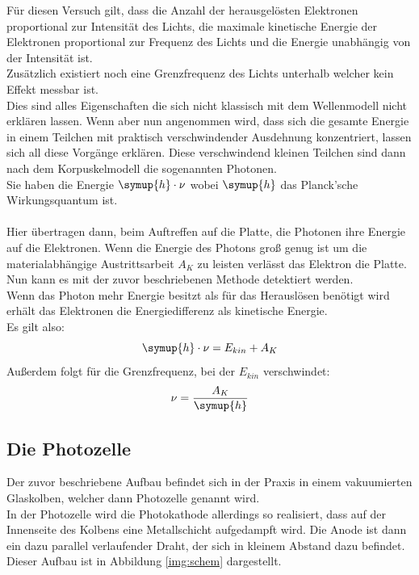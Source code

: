     \noindent Für diesen Versuch gilt, dass die Anzahl der herausgelösten Elektronen proportional zur Intensität des Lichts, 
    die maximale kinetische Energie der Elektronen proportional zur Frequenz des Lichts und die Energie unabhängig von der Intensität ist.\\
    Zusätzlich existiert noch eine Grenzfrequenz des Lichts unterhalb welcher kein Effekt messbar ist.\\
    Dies sind alles Eigenschaften die sich nicht klassisch mit dem Wellenmodell nicht erklären lassen. Wenn aber nun angenommen wird, 
    dass sich die gesamte Energie in einem Teilchen mit praktisch verschwindender Ausdehnung konzentriert, lassen sich all diese Vorgänge erklären.
    Diese verschwindend kleinen Teilchen sind dann nach dem Korpuskelmodell die sogenannten Photonen.\\
    Sie haben die Energie $\symup{h}\cdot \nu$ wobei $\symup{h}$ das Planck'sche Wirkungsquantum\cite{Planck} ist.\\\\
    \noindent Hier übertragen dann, beim Auftreffen auf die Platte, die Photonen ihre Energie auf die Elektronen.
    Wenn die Energie des Photons groß genug ist um die materialabhängige Austrittsarbeit $A_K$ zu leisten verlässt das Elektron die Platte.
    Nun kann es mit der zuvor beschriebenen Methode detektiert werden.\\
    Wenn das Photon mehr Energie besitzt als für das Herauslösen benötigt wird erhält das Elektronen die Energiedifferenz als kinetische Energie.\\
    Es gilt also:
    \begin{equation*}
        \symup{h} \cdot \nu = E_{kin} + A_K
    \end{equation*}
    Außerdem folgt für die Grenzfrequenz, bei der $E_{kin}$ verschwindet:
    \begin{equation*}
        \nu=\frac{A_K}{\symup{h}}
    \end{equation*}
        
    \subsection{Die Photozelle}

    \noindent Der zuvor beschriebene Aufbau befindet sich in der Praxis in einem vakuumierten Glaskolben, welcher dann Photozelle genannt wird.\\
    In der Photozelle wird die Photokathode allerdings so realisiert, dass auf der Innenseite des Kolbens eine Metallschicht aufgedampft wird.
    Die Anode ist dann ein dazu parallel verlaufender Draht, der sich in kleinem Abstand dazu befindet.\\
    Dieser Aufbau ist in Abbildung \ref{img:schem} dargestellt.
    

